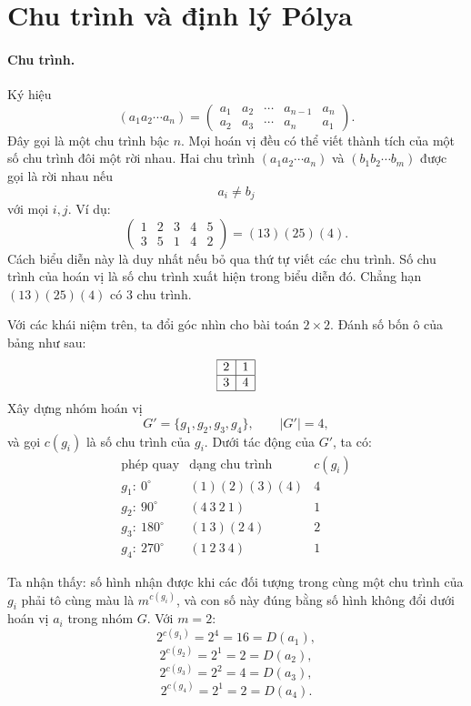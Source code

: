 \documentclass[11pt]{article}
\begin{document}
\section{Chu trình và định lý Pólya}

\paragraph{Chu trình.}
Ký hiệu
\[
  (a_1a_2\cdots a_n)=
  \begin{pmatrix}
    a_1&a_2&\cdots&a_{n-1}&a_n\\
    a_2&a_3&\cdots&a_n&a_1
  \end{pmatrix}.
\]
Đây gọi là một chu trình bậc \(n\). Mọi hoán vị đều có thể viết thành tích
của một số chu trình đôi một rời nhau. Hai chu trình
\((a_1a_2\cdots a_n)\) và \((b_1b_2\cdots b_m)\) được gọi là rời nhau nếu
\[
  a_i\ne b_j
\]
với mọi \(i,j\). Ví dụ:
\[
  \begin{pmatrix}
    1&2&3&4&5\\
    3&5&1&4&2
  \end{pmatrix}
  =(13)(25)(4).
\]
Cách biểu diễn này là duy nhất nếu bỏ qua thứ tự viết các chu trình. Số chu
trình của hoán vị là số chu trình xuất hiện trong biểu diễn đó. Chẳng hạn
\((13)(25)(4)\) có \(3\) chu trình.

Với các khái niệm trên, ta đổi góc nhìn cho bài toán \(2\times2\). Đánh số
bốn ô của bảng như sau:
\[
\begin{array}{|c|c|}
\hline
2&1\\ \hline
3&4\\ \hline
\end{array}
\]
Xây dựng nhóm hoán vị
\[
  G'=\{g_1,g_2,g_3,g_4\},\qquad |G'|=4,
\]
và gọi \(c(g_i)\) là số chu trình của \(g_i\). Dưới tác động của \(G'\), ta
có:
\[
\begin{array}{c|c|c}
\text{phép quay} & \text{dạng chu trình} & c(g_i)\\ \hline
g_1:\ 0^\circ & (1)(2)(3)(4) & 4\\
g_2:\ 90^\circ & (4\ 3\ 2\ 1) & 1\\
g_3:\ 180^\circ & (1\ 3)(2\ 4) & 2\\
g_4:\ 270^\circ & (1\ 2\ 3\ 4) & 1
\end{array}
\]

Ta nhận thấy: số hình nhận được khi các đối tượng trong cùng một chu trình
của \(g_i\) phải tô cùng màu là \(m^{c(g_i)}\), và con số này đúng bằng số
hình không đổi dưới hoán vị \(a_i\) trong nhóm \(G\). Với \(m=2\):
\[
  2^{c(g_1)}=2^4=16=D(a_1),
\]
\[
  2^{c(g_2)}=2^1=2=D(a_2),
\]
\[
  2^{c(g_3)}=2^2=4=D(a_3),
\]
\[
  2^{c(g_4)}=2^1=2=D(a_4).
\]
\end{document}

